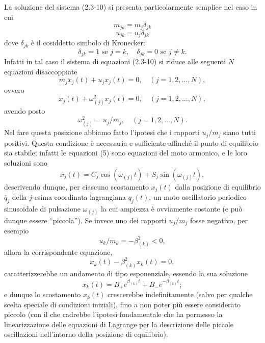 \documentclass[11pt, a4paper]{book}
\numberwithin{equation}{section}
\begin{document}
La soluzione del sistema (2.3-10) si presenta particolarmente semplice nel caso in cui
\begin{equation}
m_{jk} = m_j \delta_{jk}
\end{equation}
\begin{equation}
u_{jk} = u_j \delta_{jk}
\end{equation}
dove $\delta_{jk}$ è il cosiddetto simbolo di Kronecker:
\begin{equation}
\delta_{jk} = 1 \text{ se } j=k, \quad \delta_{jk} = 0 \text{ se } j \neq k.
\end{equation}
Infatti in tal caso il sistema di equazioni (2.3-10) si riduce alle seguenti $N$ equazioni disaccoppiate
\begin{equation}
m_j \ddot{x}_j(t) + u_j x_j(t) = 0, \quad (j = 1, 2, \dots, N),
\end{equation}
ovvero
\begin{equation}
\ddot{x}_j(t) + \omega_{(j)}^2 x_j(t) = 0, \quad (j = 1, 2, \dots, N),
\end{equation}
avendo posto
\begin{equation}
\omega_{(j)}^2 = u_j / m_j, \quad (j = 1, 2, \dots, N).
\end{equation}
Nel fare questa posizione abbiamo fatto l'ipotesi che i rapporti $u_j / m_j$ siano tutti positivi. Questa condizione è necessaria e sufficiente affinché il punto di equilibrio sia stabile; infatti le equazioni (5) sono equazioni del moto armonico, e le loro soluzioni sono
\begin{equation}
x_j(t) = C_j \cos(\omega_{(j)} t) + S_j \sin(\omega_{(j)} t),
\end{equation}
descrivendo dunque, per ciascuno scostamento $x_j(t)$ dalla posizione di equilibrio $\overline{q}_j$ della $j$-esima coordinata lagrangiana $q_j(t)$, un moto oscillatorio periodico sinusoidale di pulsazione $\omega_{(j)}$ la cui ampiezza è ovviamente costante (e può dunque essere ``piccola''). Se invece uno dei rapporti $u_j / m_j$ fosse negativo, per esempio
\begin{equation}
u_k / m_k = -\beta_{(k)}^2 < 0,
\end{equation}
allora la corrispondente equazione,
\begin{equation}
\ddot{x}_k(t) - \beta_{(k)}^2 x_k(t) = 0,
\end{equation}
caratterizzerebbe un andamento di tipo esponenziale, essendo la sua soluzione
\begin{equation}
x_k(t) = B_+ e^{\beta_{(k)} t} + B_- e^{-\beta_{(k)} t};
\end{equation}
e dunque lo scostamento $x_k(t)$ crescerebbe indefinitamente (salvo per qualche scelta speciale di condizioni iniziali), fino a non poter più essere considerato piccolo (con il che cadrebbe l'ipotesi fondamentale che ha permesso la linearizzazione delle equazioni di Lagrange per la descrizione delle piccole oscillazioni nell'intorno della posizione di equilibrio).
\end{document}

